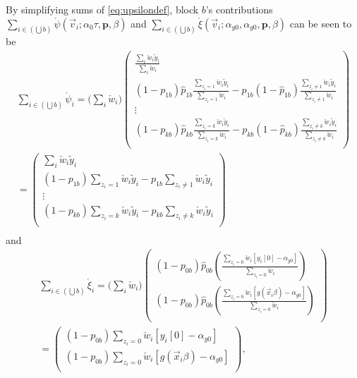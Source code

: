 \documentclass{article}
\newcommand{\owt}[1][{[z_{i}]}]{\ensuremath{\check{w}_{i#1}}}
\begin{document}
By simplifying sums of \eqref{eq:upsilondef},  block $b$'s contributions
$\sum_{i \in (\bigcup b)} \acute{\psi}(\vec{v}_{i};
\alpha_{0} \tau,
\mathbf{p}, \beta)$ and
$\sum_{i \in (\bigcup b)} \acute{\xi}(\vec{v}_{i};
\alpha_{y0}, \alpha_{g0}, \mathbf{p}, \beta)$ can be seen to be 
\begin{multline}
  \sum_{i \in (\bigcup b)}\acute{\psi}_{i}=  \big(\sum_{i} \owt[]\big)
        \left(
          \begin{array}{c}
            \frac{\sum_{i}\owt[]\tilde{y}_{i}}{\sum_{i} \owt[]}\\
         {} (1-{p}_{1b})
            \hat{p}_{1b}\frac{\sum_{{z_i=1}}\owt[]\tilde{y}_{i}}{\sum_{{z_i=1}}\owt[]}  -
      p_{1b}(1-\hat{p}_{1b})\frac{\sum_{{z_i\neq
            1}}\owt[]\tilde{y}_{i}}{\sum_{{z_i\neq 1}}\owt[]}\\
      \vdots\\
         {}
            (1-{p}_{kb})\hat{p}_{kb}\frac{\sum_{{z_i=k}}\owt[]\tilde{y}_{i}}{\sum_{{z_i=k}}\owt[]}  -
      p_{kb}(1-\hat{p}_{kb})\frac{\sum_{{z_i\neq
            k}}\owt[]\tilde{y}_{i}}{\sum_{{z_i\neq k}}\owt[]} \\
          \end{array}
        \right)\\
= 
        \left(
          \begin{array}{c}
            \sum_{i}\owt[]\tilde{y}_{i}\\
         {} (1-{p}_{1b})
            {\sum_{{z_i=1}}\owt[]\tilde{y}_{i}}  -
      p_{1b}{\sum_{{z_i\neq
            1}}\owt[]\tilde{y}_{i}}\\
      \vdots\\
         {}
            (1-{p}_{kb}){\sum_{{z_i=k}}\owt[]\tilde{y}_{i}}  -
      p_{kb}{\sum_{{z_i\neq
            k}}\owt[]\tilde{y}_{i}} \\
          \end{array}
        \right)\\
  \label{eq:31}
\end{multline}
and
\begin{multline}\label{eq:34}
\sum_{i \in (\bigcup b)}\acute{\xi}_{i}=  \big(\sum_{i} \owt[]\big)
\begin{pmatrix}
              (1-{p}_{0b})
            \hat{p}_{0b}\left(\frac{\sum_{{z_i=0}}\owt[][y_{i}[0] -\alpha_{y0}] }{\sum_{{z_i=0}}\owt[]}
            \right)\\
              (1-{p}_{0b})
            \hat{p}_{0b}\left(\frac{\sum_{{z_i=0}}\owt[][g(\vec{x}_{i}\beta)-\alpha_{g0}] }{\sum_{{z_i=0}}\owt[]}
            \right)\\
\end{pmatrix}\\
=
\begin{pmatrix}
              (1-{p}_{0b})
            {\sum_{{z_i=0}}\owt[] [y_{i}[0] -\alpha_{y0}]}
            \\
              (1-{p}_{0b})
            {\sum_{{z_i=0}}\owt[] [g(\vec{x}_{i}\beta)-\alpha_{g0}]}
  \\
\end{pmatrix},
\end{multline}
\end{document}
